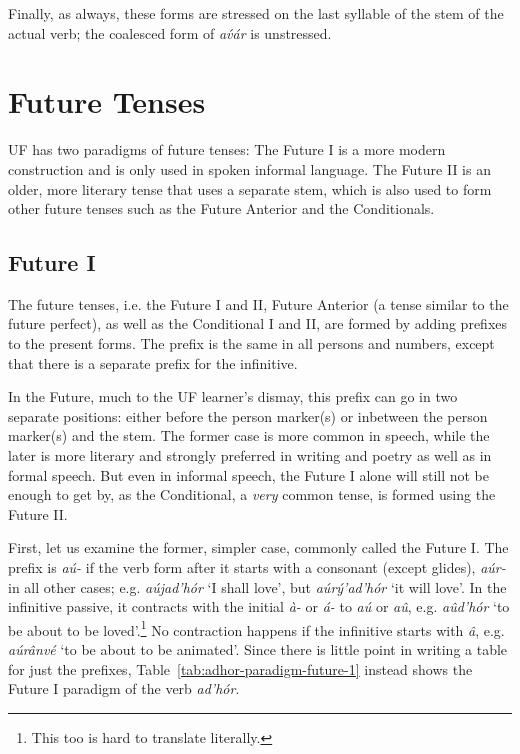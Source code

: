 \documentclass[a4paper, 12pt, twoside, openright, final]{book}
\let \w \textit
\begin{document}
Finally, as always, these forms are stressed on the last syllable of the stem of the actual verb; the coalesced form
of \w{av́ár} is unstressed.

\section{Future Tenses}
UF has two paradigms of future tenses: The Future I is a more modern construction and is only used in spoken informal
language. The Future II is an older, more literary tense that uses a separate stem, which is also used to form other future
tenses such as the Future Anterior and the Conditionals.

\subsection{Future I}\label{subsubsec:future-i}
The future tenses, i.e. the Future I and II, Future Anterior (a tense similar to the future perfect), as well
as the Conditional I and II, are formed by adding prefixes to the present forms. The prefix is the same in all persons and numbers,
except that there is a separate prefix for the infinitive.

In the Future, much to the UF learner’s dismay, this prefix can go in two separate positions: either before the person marker(s) or
inbetween the person marker(s) and the stem. The former case is more common in speech, while the later is more literary
and strongly preferred in writing and poetry as well as in formal speech. But even in informal speech, the Future I alone
will still not be enough to get by, as the Conditional, a \textit{very} common tense, is formed using the Future II.

First, let us examine the former, simpler case, commonly called the Future I. The prefix is \w{aú-} if the verb form
after it starts with a consonant (except glides), \w{aúr-} in all other cases; e.g. \w{aújad’hór} ‘I shall love’, but
\w{aúrý’ad’hór} ‘it will love’. In the infinitive passive, it
contracts with the initial \w{à-} or \w{á-} to \w{aú} or \w{aû}, e.g. \w{aûd’hór} ‘to be about to be loved’.\footnote{This too is
hard to translate literally.} No contraction happens
if the infinitive starts with \w{â}, e.g. \w{aúrânvé} ‘to be about to be animated’. Since
there is little point in writing a table for just the prefixes, Table~\ref{tab:adhor-paradigm-future-1} instead shows the Future I paradigm
of the verb \emph{ad’hór}.
\end{document}
